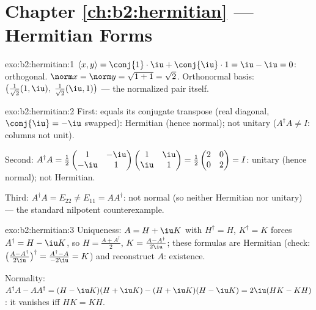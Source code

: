 \section*{Chapter \ref{ch:b2:hermitian} --- Hermitian Forms}

\begin{solution}{exo:b2:hermitian:1}
$\langle x, y\rangle = \conj{1}\cdot\iu + \conj{\iu}\cdot 1 = \iu -
\iu = 0$: orthogonal. $\norm x = \norm y = \sqrt{1 + 1} = \sqrt2$.
Orthonormal basis: $\bigl(\frac{1}{\sqrt2}(1, \iu),\;
\frac{1}{\sqrt2}(\iu, 1)\bigr)$ --- the normalized pair itself.
\end{solution}

\begin{solution}{exo:b2:hermitian:2}
First: equals its conjugate transpose (real diagonal, $\conj{\iu} =
-\iu$ swapped): Hermitian (hence normal); not unitary ($A^\dagger A
\neq I$: columns not unit).

Second: $A^\dagger A = \frac12\begin{pmatrix} 1 & -\iu\\ -\iu &
1\end{pmatrix}\begin{pmatrix} 1 & \iu\\ \iu & 1\end{pmatrix} =
\frac12\begin{pmatrix} 2 & 0\\ 0 & 2\end{pmatrix} = I$: unitary
(hence normal); not Hermitian.

Third: $A^\dagger A = E_{22} \neq E_{11} = AA^\dagger$: not normal
(so neither Hermitian nor unitary) --- the standard nilpotent
counterexample.
\end{solution}

\begin{solution}{exo:b2:hermitian:3}
Uniqueness: $A = H + \iu K$ with $H^\dagger = H$, $K^\dagger = K$
forces $A^\dagger = H - \iu K$, so $H = \frac{A + A^\dagger}{2}$,
$K = \frac{A - A^\dagger}{2\iu}$; these formulas are Hermitian
(check: $\bigl(\frac{A - A^\dagger}{2\iu}\bigr)^\dagger = \frac{
A^\dagger - A}{-2\iu} = K$) and reconstruct $A$: existence.

Normality: $A^\dagger A - AA^\dagger = (H - \iu K)(H + \iu K) - (H
+ \iu K)(H - \iu K) = 2\iu(HK - KH)$: it vanishes iff $HK = KH$.
\end{solution}

